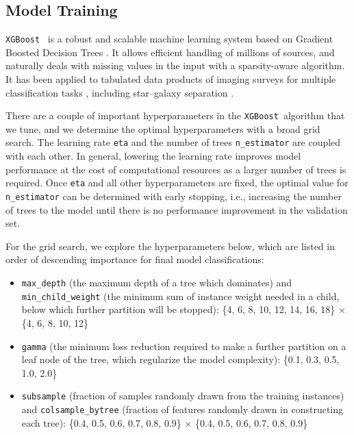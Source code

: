 \documentclass[twocolumn]{aastex631}
\newcommand{\xgboost}{\texttt{XGBoost}}
\begin{document}
\begin{CJK*}{UTF8}{gbsn}
\section{Model Training}\label{sec:model}

\xgboost\ \citep{XGBoost_2016} is a robust and scalable machine learning system based on Gradient Boosted Decision Trees \citep{Friedman_2001}. It allows efficient handling of millions of sources, and naturally deals with missing values in the input with a sparsity-aware algorithm. It has been applied to tabulated data products of imaging surveys for multiple classification tasks \citep[e.g.,][]{Jin_2019, Nakoneczny_2021, Fu_2024, vonMarttens_2024, Zeraatgari_2024}, including star--galaxy separation \citep{Stoppa_2023}.

There are a couple of important hyperparameters in the \xgboost\ algorithm that we tune, and we determine the optimal hyperparameters with a broad grid search. The learning rate \texttt{eta} and the number of trees \texttt{n\_estimator} are coupled with each other. In general, lowering the learning rate improves model performance at the cost of computational resources as a larger number of trees is required. Once \texttt{eta} and all other hyperparameters are fixed, the optimal value for \texttt{n\_estimator} can be determined with early stopping, i.e., increasing the number of trees to the model until there is no performance improvement in the validation set. 

For the grid search, we explore the hyperparameters below, which are listed in order of descending importance for final model classifications:
\begin{itemize}
    \item \texttt{max\_depth} (the maximum depth of a tree which dominates) and \texttt{min\_child\_weight} (the minimum sum of instance weight needed in a child, below which further partition will be stopped): \{4, 6, 8, 10, 12, 14, 16, 18\} $\times$ \{4, 6, 8, 10, 12\}
    \item \texttt{gamma} (the minimum loss reduction required to make a further partition on a leaf node of the tree, which regularize the model complexity): \{0.1, 0.3, 0.5, 1.0, 2.0\}
    \item \texttt{subsample} (fraction of samples randomly drawn from the training instances) and \texttt{colsample\_bytree} (fraction of features randomly drawn in constructing each tree): \{0.4, 0.5, 0.6, 0.7, 0.8, 0.9\} $\times$ \{0.4, 0.5, 0.6, 0.7, 0.8, 0.9\}
\end{itemize}


\end{CJK*}
\end{document}
